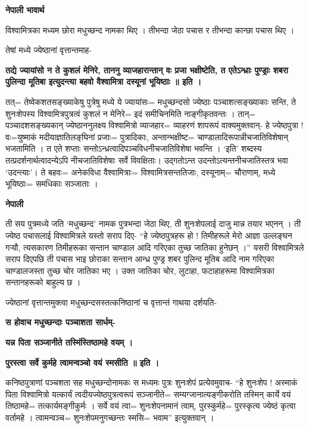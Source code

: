 \documentclass[11pt, a5paper]{article}
\begin{document}
\textbf{नेपाली भावार्थ}

विश्वामित्रका मध्यम छोरा मधुच्छन्द नामका थिए । तीभन्दा जेठा पचास र तीभन्दा कान्छा पचास थिए ।

तेषां मध्ये ज्येष्ठानां वृत्तान्तमाह-

\textbf{तद्ये ज्यायांसो न ते कुशलं मेनिरे, ताननु व्याजहारान्तान् वः प्रजा भक्षीष्टेति, त एतेऽन्ध्राः पुण्ड्राः शबरा पुलिन्दा मूतिबा इत्युदन्त्या बहवो वैश्वामित्रा दस्यूनां भूयिष्ठाः ॥ इति ।}

तत्= तेष्वेकशतसङ्‌ख्याकेषु पुत्रेषु मध्ये ये ज्यायांसः= मधुच्छन्दसो ज्येष्ठाः पञ्चाशत्सङ्‌ख्याकाः सन्ति, ते शुनःशेपस्य विश्वामित्रपुत्रत्वं कुशलं न मेनिरे= इदं समीचिनमिति नाङ्‌गीकृतवन्तः । तान्= पञ्चादशसङ्‌ख्यकान् ज्येष्ठाननुलक्ष्य विश्वामित्रो व्याजहार= व्याहरणं  शापरूपं वाक्यमुक्तवान्- हे ज्येष्ठपुत्रा ! वः=युष्माकं मदीयाज्ञातिलङ्‌घिनां प्रजाः= पुत्रादिकाः, अन्तान्भक्षीष्ट= चाण्डालादिरूपान्नीचजातिविशेषान् भजतामिति । त एते शप्ताः सन्तोऽन्ध्रत्वादिपञ्चविधनीचजातिविशेषा भवन्ति । ‘इति’ शब्दस्य तत्प्रदर्शनार्थत्वादन्येऽपि नीचजातिविशेषाः सर्वे विवक्षिताः। उद्गतोऽन्त उदन्तोऽत्यन्तनीचजातिस्तत्र भवा ‘उदन्त्याः’। ते बहवः= अनेकविधा वैश्वामित्राः= विश्वामित्रसन्ततिजाः, दस्यूनाम्= चौराणाम्, मध्ये भूयिष्ठाः‍= समधिकाः सञ्जाताः ।

\textbf{नेपाली}

ती सय पुत्रमध्ये जति ‘मधुच्छन्द’ नामक पुत्रभन्दा जेठा थिए, ती शुनःशेपलाई दाजु मान्न तयार भएनन् । ती ज्येष्ठ पचासलाई विश्वामित्रले यस्तो सराप दिए- “हे ज्येष्ठपुत्रहरू हो ! तिमीहरूले मेरो आज्ञा उल्लङ्‌घन गर्‍यौ, त्यसकारण तिमीहरूका सन्तान चाण्डाल आदि गरिएका तुच्छ जातिका हुनेछन् ।” यसरी विश्वामित्रले सराप दिएपछि ती पचास भाइ छोराका सन्तान आन्ध्र पुण्ड्र शबर पुलिन्द मूतिब आदि नाम गरिएका चाण्डालजस्ता तुच्छ चोर जातिका भए । उक्त जातिका चोर, लुटाहा, फटाहाहरूमा विश्वामित्रका सन्तानहरूको बाहुल्य छ ।

ज्येष्ठानां वृत्तान्तमुक्त्वा मधुच्छन्दसस्तत्कनिष्ठानां च वृत्तान्तं गाथया दर्शयति-

\textbf{स होवाच मधुच्छन्दाः पञ्चाशता सार्धम्-}

\textbf{यन्न पिता सञ्जानीते तस्मिंस्तिष्ठामहे वयम् ।}

\textbf{पुरस्त्वा सर्वे कुर्महे त्वामन्वञ्चो वयं स्मसीति ॥ इति ।}

कनिष्ठपुत्राणां पञ्चशता सह मधुच्छन्दोनामकः स मध्यमः पुत्रः शुनःशेपं प्रत्येवमुवाच- “हे शुनःशेप ! अस्माकं पिता विश्वामित्रो यत्कार्यं त्वदीयज्येष्ठपुत्रत्वरूपं सञ्जानीते= सम्यग्जानात्यङ्‌गीकरोति तस्मिन् कार्ये वयं तिष्ठामहे= तत्कार्यमङ्‌गीकुर्मः । सर्वे वयं त्वा= शुनःशेपनामानं त्वाम्, पुरस्कुर्महे= पुरस्कृत्य ज्येष्ठं कृत्वा वर्तामहे । त्वामन्वञ्च= शुनःशेपमनुगच्छन्तः स्मसि= भवाम”  इत्युक्तवान् ।
\end{document}
